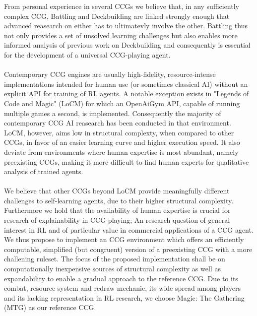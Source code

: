 \documentclass[
	english,%
	accentcolor=9c,%
	type=intern, %
	marginpar=false,%
]{tudapub}
\begin{document}
From personal experience in several CCGs we believe that, in any sufficiently complex CCG, Battling and Deckbuilding are linked strongly enough that advanced reasearch on either has to ultimatevly involve the other.
Battling thus not only provides a set of unsolved learning challenges but also enables more informed analysis of previous work on Deckbuilding and consequently is essential for the development of a universal CCG-playing agent.
\\ \\
Contemporary CCG engines are usually high-fidelity, resource-intense implementations intended for human use (or sometimes classical AI) without an explicit API for training of RL agents.
A notable exception exists in "Legends of Code and Magic" (LoCM)\cite{2020OpenAiLocm} for which an OpenAiGym API, capable of running multiple games a second, is implemented. 
Consequently the majority of contemporary CCG AI reasearch has been conducted in that environment.
LoCM, however, aims low in structural complexty, when compared to other CCGs, in favor of an easier learning curve and higher execution speed.
It also deviate from environments where human expertise is most abundant, namely preexisting CCGs, making it more difficult to find human experts for qualitative analysis of trained agents.
\\ \\
We believe that other CCGs beyond LoCM provide meaningfully different challenges to self-learning agents, due to their higher structural complexity\cite{2024Taxonomy}.
Furthermore we hold that the availability of human expertise is crucial for research of explainability in CCG playing; An research question of general interest in RL and of particular value in commercial applications of a CCG agent.
We thus propose to implement an CCG environment which offers an efficiently computable, simplified (but congruent) version of a preexisting CCG with a more challening ruleset.
The focus of the proposed implementation shall be on computationally inexpensive sources of structural complexity as well as expandability to enable a gradual approach to the reference CCG.
Due to its combat, resource system and redraw mechanic, its wide spread among players and its lacking representation in RL research, we choose Magic: The Gathering (MTG) as our reference CCG.
\end{document}
